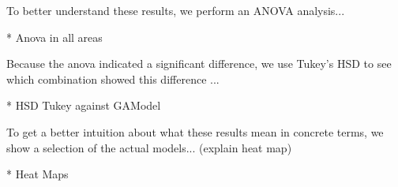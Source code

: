 
To better understand these results, we perform an ANOVA analysis...

* Anova in all areas

Because the anova indicated a significant difference, we use Tukey's
HSD to see which combination showed this difference ...

* HSD Tukey against GAModel


To get a better intuition about what these results mean in concrete
terms, we show a selection of the actual models... (explain heat map)

* Heat Maps
